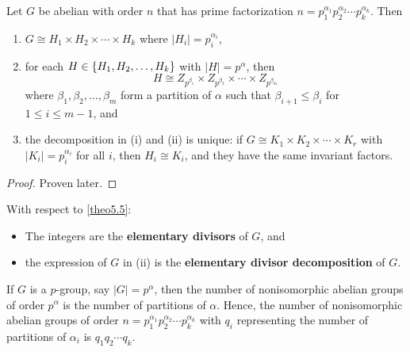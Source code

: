  \label{theo5.5}
Let $G$ be abelian with order $n$ that has prime factorization $n = p_1^{\alpha_1} p_2^{\alpha_2} \cdots p_k^{\alpha_k}$. Then
\begin{enumerate}
    \item $G \cong H_1 \times H_2 \times \cdots \times H_k$ where $|H_i| = p_i^{\alpha_i}$,
    \item for each $H \in \{H_1, H_2, \ldots, H_k\}$ with $|H| = p^\alpha$, then
    \[H \cong Z_{p^{\beta_1}} \times Z_{p^{\beta_2}} \times \cdots \times Z_{p^{\beta_m}}\]
    where $\beta_1, \beta_2, \ldots, \beta_m$ form a partition of $\alpha$ such that $\beta_{i + 1} \leq \beta_i$ for $1 \leq i \leq m - 1$, and
    \item the decomposition in (i) and (ii) is unique: if $G \cong K_1 \times K_2 \times \cdots \times K_r$ with $|K_i| = p_i^{\alpha_i}$ for all $i$, then $H_i \cong K_i$, and they have the same invariant factors.
\end{enumerate}

\begin{proof}
    Proven later.
\end{proof}

 With respect to \autoref{theo5.5}:
\begin{itemize}
    \item The integers  are the \textbf{elementary divisors} of $G$, and
    \item the expression of $G$ in (ii) is the \textbf{elementary divisor decomposition} of $G$.
\end{itemize}

\note If $G$ is a $p$-group, say $|G| = p^\alpha$, then the number of nonisomorphic abelian groups of order $p^\alpha$ is the number of partitions of $\alpha$. Hence, the number of nonisomorphic abelian groups of order $n = p_1^{\alpha_1} p_2^{\alpha_2} \cdots p_k^{\alpha_k}$ with $q_i$ representing the number of partitions of $\alpha_i$ is $q_1q_2 \cdots q_k$.

